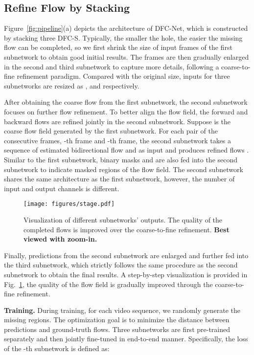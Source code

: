 \documentclass[10pt,twocolumn,letterpaper]{article}
\begin{document}
\subsection{Refine Flow by Stacking}
\label{sec:stacking}
Figure~\ref{fig:pipeline}(a) depicts the architecture of DFC-Net, which is constructed by stacking three DFC-S.
Typically, the smaller the hole, the easier the missing flow can be completed, so we first shrink the size of input frames of the first subnetwork to obtain good initial results.
The frames are then gradually enlarged in the second and third subnetwork to capture more details, following a coarse-to-fine refinement paradigm.
Compared with the original size, inputs for three subnetworks are resized as ,  and  respectively. 

After obtaining the coarse flow from the first subnetwork, the second subnetwork focuses on further flow refinement. 
To better align the flow field, the forward and backward flows are refined jointly in the second subnetwork.
Suppose  is the coarse flow field generated by the first subnetwork.
For each pair of the consecutive frames, -th frame and -th frame, the second subnetwork takes a sequence of estimated bidirectional flow  and   as input and produces refined flows .
Similar to the first subnetwork, binary masks  and  are also fed into the second subnetwork to indicate masked regions of the flow field.
The second subnetwork shares the same architecture as the first subnetwork, however, the number of input and output channels is different.

\begin{figure}
	\centering
	\texttt{[image: figures/stage.pdf]}
	\vspace{-20pt}
	\caption{\small{Visualization of different subnetworks’ outputs. The quality of the completed flows is improved over the coarse-to-fine refinement. \textbf{Best viewed with zoom-in.}}}
	\label{fig:stage}
	\vspace{-5pt}
\end{figure}

Finally, predictions from the second subnetwork are enlarged and further fed into the third subnetwork, which strictly follows the same procedure as the second subnetwork to obtain the final results.
A step-by-step visualization is provided in Fig.~\ref{fig:stage}, the quality of the flow field is gradually improved through the coarse-to-fine refinement.

\noindent\textbf{Training.}
During training, for each video sequence, we randomly generate the missing regions. The optimization goal is to minimize the  distance between predictions and ground-truth flows.
Three subnetworks are first pre-trained separately and then jointly fine-tuned in end-to-end manner.
Specifically, the loss of the -th subnetwork is defined as:
\vspace{-5pt}
\end{document}
